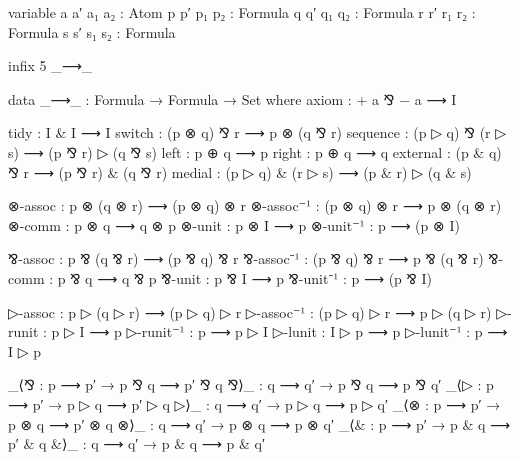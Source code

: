 \begin{code}[hide]
variable
  a a′ a₁ a₂ : Atom
  p p′ p₁ p₂ : Formula
  q q′ q₁ q₂ : Formula
  r r′ r₁ r₂ : Formula
  s s′ s₁ s₂ : Formula
\end{code}

\begin{code}[hide]
infix 5 _⟶_
\end{code}

\begin{code}
data _⟶_ : Formula → Formula → Set where
  axiom      : + a ⅋ − a ⟶ I

  tidy       : I & I ⟶ I
  switch     : (p ⊗ q) ⅋ r ⟶ p ⊗ (q ⅋ r)
  sequence   : (p ▷ q) ⅋ (r ▷ s) ⟶ (p ⅋ r) ▷ (q ⅋ s)
  left       : p ⊕ q ⟶ p
  right      : p ⊕ q ⟶ q
  external   : (p & q) ⅋ r ⟶ (p ⅋ r) & (q ⅋ r)
  medial     : (p ▷ q) & (r ▷ s) ⟶ (p & r) ▷ (q & s)

  ⊗-assoc    : p ⊗ (q ⊗ r) ⟶ (p ⊗ q) ⊗ r
  ⊗-assoc⁻¹  : (p ⊗ q) ⊗ r ⟶ p ⊗ (q ⊗ r)
  ⊗-comm     : p ⊗ q ⟶ q ⊗ p
  ⊗-unit     : p ⊗ I ⟶ p
  ⊗-unit⁻¹   : p ⟶ (p ⊗ I)

  ⅋-assoc    : p ⅋ (q ⅋ r) ⟶ (p ⅋ q) ⅋ r
  ⅋-assoc⁻¹  : (p ⅋ q) ⅋ r ⟶ p ⅋ (q ⅋ r)
  ⅋-comm     : p ⅋ q ⟶ q ⅋ p
  ⅋-unit     : p ⅋ I ⟶ p
  ⅋-unit⁻¹   : p ⟶ (p ⅋ I)

  ▷-assoc    : p ▷ (q ▷ r) ⟶ (p ▷ q) ▷ r
  ▷-assoc⁻¹  : (p ▷ q) ▷ r ⟶ p ▷ (q ▷ r)
  ▷-runit    : p ▷ I ⟶ p
  ▷-runit⁻¹  : p ⟶ p ▷ I
  ▷-lunit    : I ▷ p ⟶ p
  ▷-lunit⁻¹  : p ⟶ I ▷ p

  _⟨⅋        : p ⟶ p′ → p ⅋ q ⟶ p′ ⅋ q
  ⅋⟩_        : q ⟶ q′ → p ⅋ q ⟶ p ⅋ q′
  _⟨▷        : p ⟶ p′ → p ▷ q ⟶ p′ ▷ q
  ▷⟩_        : q ⟶ q′ → p ▷ q ⟶ p ▷ q′
  _⟨⊗        : p ⟶ p′ → p ⊗ q ⟶ p′ ⊗ q
  ⊗⟩_        : q ⟶ q′ → p ⊗ q ⟶ p ⊗ q′
  _⟨&        : p ⟶ p′ → p & q ⟶ p′ & q
  &⟩_        : q ⟶ q′ → p & q ⟶ p & q′
\end{code}

